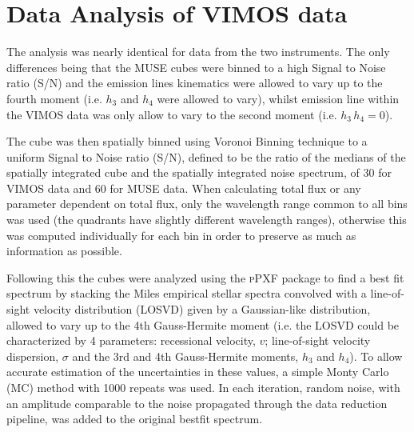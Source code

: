 \documentclass[fleqn,usenatbib,useAMS]{mnras}
\begin{document}


\section{Data Analysis of VIMOS data}
	\label{sec:analysis}
	The analysis was nearly identical for data from the two instruments. The only differences being that the MUSE cubes were binned to a high Signal to Noise ratio (S/N) and the emission lines kinematics were allowed to vary up to the fourth moment (i.e. $h_3$ and $h_4$ were allowed to vary), whilst emission line within the VIMOS data was only allow to vary to the second moment (i.e. $h_3 \, h_4 = 0$). 


	The cube was then spatially binned using Voronoi Binning technique \citep{Cappellari2003} to a uniform Signal to Noise ratio (S/N), defined to be the ratio of the medians of the spatially integrated cube and the spatially integrated noise spectrum, of 30 for VIMOS data and 60 for MUSE data. %
	When calculating total flux or any parameter dependent on total flux, only the wavelength range common to all bins was used (the quadrants have slightly different wavelength ranges), otherwise this was computed individually for each bin in order to preserve as much as information as possible.

	Following this the cubes were analyzed using the \textsc{pPXF} package \citep{Cappellari2004} to find a best fit spectrum by stacking the Miles empirical stellar spectra \citep{Sanchez-Blazquez2006} convolved with a line-of-sight velocity distribution (LOSVD) given by a Gaussian-like distribution, allowed to vary up to the 4th Gauss-Hermite moment (i.e. the LOSVD could be characterized by 4 parameters: recessional velocity, $v$; line-of-sight velocity dispersion, $\sigma$ and the 3rd and 4th Gauss-Hermite moments, $h_3$ and $h_4$). To allow accurate estimation of the uncertainties in these values, a simple Monty Carlo (MC) method with 1000 repeats was used. In each iteration, random noise, with an amplitude comparable to the noise propagated through the data reduction pipeline, was added to the original bestfit spectrum.
\end{document}
